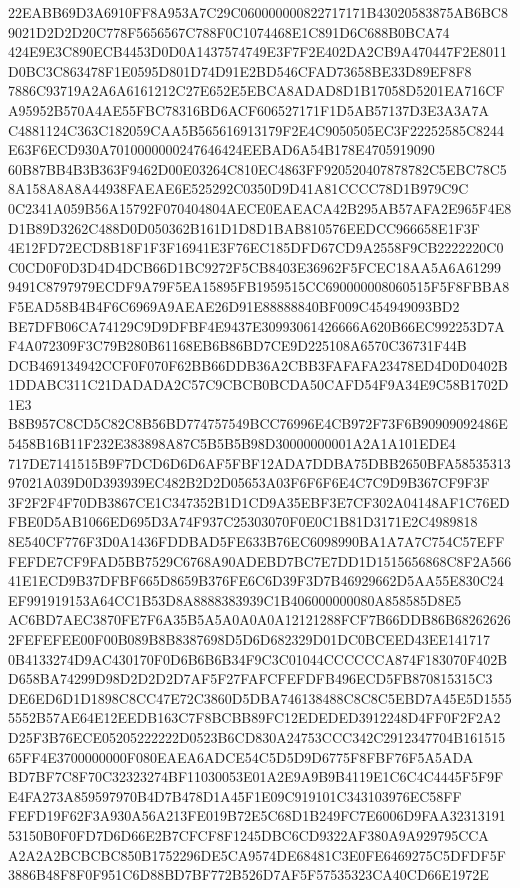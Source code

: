 \documentclass[UTF8,fontset=fandol,zihao=-4,a4paper]{ctexart}
\begin{document}
{{22EABB69D3A6910FF8A953A7C29C060000000822717171B43020583875AB6BC89021D2D2D20C778F5656567C788F0C1074468E1C891D6C688B0BCA74
424E9E3C890ECB4453D0D0A1437574749E3F7F2E402DA2CB9A470447F2E8011D0BC3C863478F1E0595D801D74D91E2BD546CFAD73658BE33D89EF8F8
7886C93719A2A6A6161212C27E652E5EBCA8ADAD8D1B17058D5201EA716CFA95952B570A4AE55FBC78316BD6ACF606527171F1D5AB57137D3E3A3A7A
C4881124C363C182059CAA5B565616913179F2E4C9050505EC3F22252585C8244E63F6ECD930A7010000000247646424EEBAD6A54B178E4705919090
60B87BB4B3B363F9462D00E03264C810EC4863FF920520407878782C5EBC78C58A158A8A8A44938FAEAE6E525292C0350D9D41A81CCCC78D1B979C9C
0C2341A059B56A15792F070404804AECE0EAEACA42B295AB57AFA2E965F4E8D1B89D3262C488D0D050362B161D1D8D1BAB810576EEDCC966658E1F3F
4E12FD72ECD8B18F1F3F16941E3F76EC185DFD67CD9A2558F9CB2222220C0C0CD0F0D3D4D4DCB66D1BC9272F5CB8403E36962F5FCEC18AA5A6A61299
9491C8797979ECDF9A79F5EA15895FB1959515CC690000008060515F5F8FBBA8F5EAD58B4B4F6C6969A9AEAE26D91E88888840BF009C454949093BD2
BE7DFB06CA74129C9D9DFBF4E9437E30993061426666A620B66EC992253D7AF4A072309F3C79B280B61168EB6B86BD7CE9D225108A6570C36731F44B
DCB469134942CCF0F070F62BB66DDB36A2CBB3FAFAFA23478ED4D0D0402B1DDABC311C21DADADA2C57C9CBCB0BCDA50CAFD54F9A34E9C58B1702D1E3
B8B957C8CD5C82C8B56BD774757549BCC76996E4CB972F73F6B90909092486E5458B16B11F232E383898A87C5B5B5B98D30000000001A2A1A101EDE4
717DE7141515B9F7DCD6D6D6AF5FBF12ADA7DDBA75DBB2650BFA5853531397021A039D0D393939EC482B2D2D05653A03F6F6F6E4C7C9D9B367CF9F3F
3F2F2F4F70DB3867CE1C347352B1D1CD9A35EBF3E7CF302A04148AF1C76EDFBE0D5AB1066ED695D3A74F937C25303070F0E0C1B81D3171E2C4989818
8E540CF776F3D0A1436FDDBAD5FE633B76EC6098990BA1A7A7C754C57EFFFEFDE7CF9FAD5BB7529C6768A90ADEBD7BC7E7DD1D1515656868C8F2A566
41E1ECD9B37DFBF665D8659B376FE6C6D39F3D7B46929662D5AA55E830C24EF991919153A64CC1B53D8A8888383939C1B406000000080A858585D8E5
AC6BD7AEC3870FE7F6A35B5A5A0A0A0A12121288FCF7B66DDB86B682626262FEFEFEE00F00B089B8B8387698D5D6D682329D01DC0BCEED43EE141717
0B4133274D9AC430170F0D6B6B6B34F9C3C01044CCCCCCA874F183070F402BD658BA74299D98D2D2D2D7AF5F27FAFCFEFDFB496ECD5FB870815315C3
DE6ED6D1D1898C8CC47E72C3860D5DBA746138488C8C8C5EBD7A45E5D15555552B57AE64E12EEDB163C7F8BCBB89FC12EDEDED3912248D4FF0F2F2A2
D25F3B76ECE05205222222D0523B6CD830A24753CCC342C2912347704B16151565FF4E3700000000F080EAEA6ADCE54C5D5D9D6775F8FBF76F5A5ADA
BD7BF7C8F70C32323274BF11030053E01A2E9A9B9B4119E1C6C4C4445F5F9FE4FA273A859597970B4D7B478D1A45F1E09C919101C343103976EC58FF
FEFD19F62F3A930A56A213FE019B72E5C68D1B249FC7E6006D9FAA3231319153150B0F0FD7D6D66E2B7CFCF8F1245DBC6CD9322AF380A9A929795CCA
A2A2A2BCBCBC850B1752296DE5CA9574DE68481C3E0FE6469275C5DFDF5F3886B48F8F0F951C6D88BD7BF772B526D7AF5F57535323CA40CD66E1972E
}}
\end{document}
